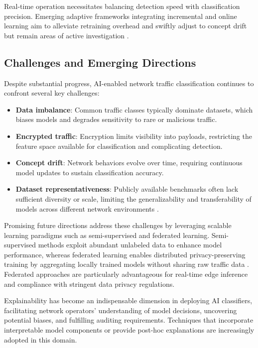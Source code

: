 \documentclass[sigconf]{acmart}
\begin{document}
Real-time operation necessitates balancing detection speed with classification precision. Emerging adaptive frameworks integrating incremental and online learning aim to alleviate retraining overhead and swiftly adjust to concept drift but remain areas of active investigation \cite{ref51}.

\subsection{Challenges and Emerging Directions}

Despite substantial progress, AI-enabled network traffic classification continues to confront several key challenges:

\begin{itemize}
    \item \textbf{Data imbalance}: Common traffic classes typically dominate datasets, which biases models and degrades sensitivity to rare or malicious traffic.
    \item \textbf{Encrypted traffic}: Encryption limits visibility into payloads, restricting the feature space available for classification and complicating detection.
    \item \textbf{Concept drift}: Network behaviors evolve over time, requiring continuous model updates to sustain classification accuracy.
    \item \textbf{Dataset representativeness}: Publicly available benchmarks often lack sufficient diversity or scale, limiting the generalizability and transferability of models across different network environments \cite{ref51}.
\end{itemize}

Promising future directions address these challenges by leveraging scalable learning paradigms such as semi-supervised and federated learning. Semi-supervised methods exploit abundant unlabeled data to enhance model performance, whereas federated learning enables distributed privacy-preserving training by aggregating locally trained models without sharing raw traffic data \cite{ref49,ref50,ref51}. Federated approaches are particularly advantageous for real-time edge inference and compliance with stringent data privacy regulations.

Explainability has become an indispensable dimension in deploying AI classifiers, facilitating network operators' understanding of model decisions, uncovering potential biases, and fulfilling auditing requirements. Techniques that incorporate interpretable model components or provide post-hoc explanations are increasingly adopted in this domain.
\end{document}
